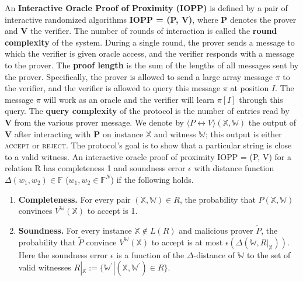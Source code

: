 \begin{definition}
An \textbf{Interactive Oracle Proof of Proximity (IOPP)} is defined by a pair of interactive randomized
algorithms \textbf{IOPP = (P, V)}, where \textbf{P} denotes the prover and \textbf{V} the verifier. 
The number of rounds of interaction is called the \textbf{round complexity} of the system. 
During a single round, the prover sends a message to which the verifier is given oracle access, and the verifier responds with a message to the prover. 
The \textbf{proof length} is the sum of the lengths of all messages sent by the prover. Specifically, the prover is allowed to send a large array message $\pi$ to the verifier, and the verifier is allowed to query this message $\pi$ at position $I$. The message $\pi$ will work as an oracle and the verifier will learn $\pi[I]$ through this query.
The \textbf{query complexity} of the protocol is the number of entries read by \textbf{V} from the various prover message.
We denote by $\langle P \leftrightarrow V \rangle (\mathbb{X}, \mathbb{W})$ the output of \textbf{V} after interacting with \textbf{P} on instance $\mathbb{X}$ and witness $\mathbb{W}$; this output is either \textsc{accept} or \textsc{reject}.
The protocol's goal is to show that a particular string is close to a valid witness.
An interactive oracle proof of proximity IOPP = (P, V) for a relation R has completeness 1 and soundness error $\epsilon$ with distance function $\Delta(w_1, w_2) \in \mathbb{F}$ ($w_1, w_2 \in \mathbb{F}^N$) if the following holds.

\begin{enumerate}
    \item \textbf{Completeness.}
    For every pair $(\mathbb{X}, \mathbb{W}) \in R$, the probability that $P(\mathbb{X}, \mathbb{W})$ convinces $V^{\mathbb{W}}(\mathbb{X})$ to accept is 1.
    
    \item \textbf{Soundness.}
    For every instance $\mathbb{X} \not\in L(R)$ and malicious prover $\tilde{P}$, the probability that $\tilde{P}$ convince $V^{\mathbb{W}}(\mathbb{X})$ to accept is at most $\epsilon(\Delta(\mathbb{W}, R|_{\mathbb{X}}))$. Here the soundness error $\epsilon$ is a function of the $\Delta$-distance of $\mathbb{W}$ to the set of valid witnesses $R|_{\mathbb{X}} := \{ \mathbb{W}^\prime | (\mathbb{X}, \mathbb{W}^\prime) \in R \}$.
\end{enumerate}
\end{definition}

